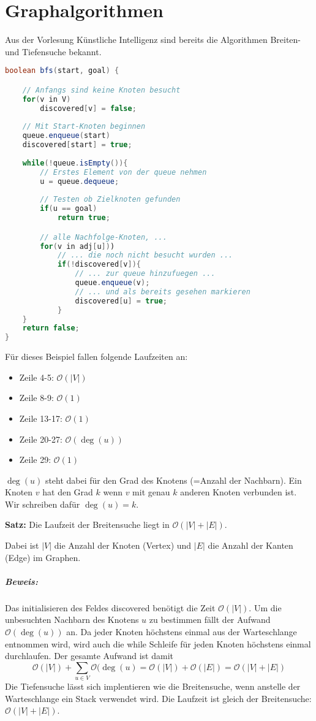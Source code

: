\chapter{Graphalgorithmen}
Aus der Vorlesung Künstliche Intelligenz sind bereits die Algorithmen Breiten- und Tiefensuche bekannt.
\begin{lstlisting}[language=java, caption={Beispiel Algorithmus für die Breitensuche}]
boolean bfs(start, goal) {

	// Anfangs sind keine Knoten besucht
	for(v in V)
		discovered[v] = false;
	
	// Mit Start-Knoten beginnen
	queue.enqueue(start)
	discovered[start] = true;
	
	while(!queue.isEmpty()){
		// Erstes Element von der queue nehmen
		u = queue.dequeue;
		
		// Testen ob Zielknoten gefunden
		if(u == goal)
			return true;

		// alle Nachfolge-Knoten, ...
		for(v in adj[u]))
			// ... die noch nicht besucht wurden ...
			if(!discovered[v]){
				// ... zur queue hinzufuegen ...
				queue.enqueue(v);
				// ... und als bereits gesehen markieren
				discovered[u] = true;
			}
	}
	return false;
}
\end{lstlisting}
\newpage
Für dieses Beispiel fallen folgende Laufzeiten an:
\begin{itemize}
	\item Zeile 4-5: \(\mathcal{O}(|V|)\)
	\item Zeile 8-9: \(\mathcal{O}(1)\)
	\item Zeile 13-17: \(\mathcal{O}(1)\)
	\item Zeile 20-27: \(\mathcal{O}(\deg(u))\)
	\item Zeile 29: \(\mathcal{O}(1)\)
\end{itemize}
\(\deg(u)\) steht dabei für den Grad des Knotens (=Anzahl der Nachbarn).
Ein Knoten \(v\) hat den Grad \(k\) wenn \(v\) mit genau \(k\) anderen Knoten verbunden ist.
Wir schreiben dafür \(\deg(u) = k\).

\begin{shaded}
	\noindent
	\textbf{Satz:} Die Laufzeit der Breitensuche liegt in \(\mathcal{O}(|V|+|E|)\).

	Dabei ist \(|V|\) die Anzahl der Knoten (Vertex) und \(|E|\) die Anzahl der Kanten (Edge) im Graphen.
\end{shaded}

\paragraph{Beweis:}
Das initialisieren des Feldes discovered benötigt die Zeit \(\mathcal{O}(|V|)\).
Um die unbesuchten Nachbarn des Knotens \(u\) zu bestimmen fällt der Aufwand \(\mathcal{O}(\deg(u))\) an.
Da jeder Knoten höchstens einmal aus der Warteschlange entnommen wird, wird auch die while Schleife für jeden Knoten höchstens einmal durchlaufen.
Der gesamte Aufwand ist damit
\[\mathcal{O}(|V|) + \sum\limits_{u \in V} \mathcal{O}(\deg(u) = \mathcal{O}(|V|) + \mathcal{O}(|E|) = \mathcal{O}(|V| + |E|)\]
Die Tiefensuche lässt sich implentieren wie die Breitensuche, wenn anstelle der Warteschlange ein Stack verwendet wird.
Die Laufzeit ist gleich der Breitensuche: \(\mathcal{O}(|V| + |E|)\).


